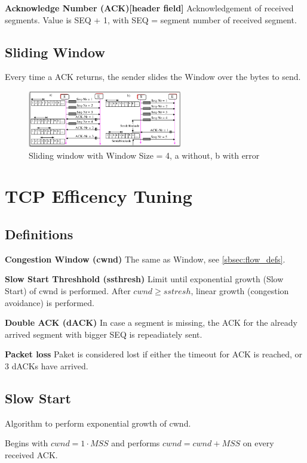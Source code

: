 \documentclass{article}
\begin{document}
\textbf{Acknowledge Number (ACK)[header field]}
Acknowledgement of received segments. Value is SEQ + 1, with SEQ = segment number of received segment.

\subsection{Sliding Window}
Every time a ACK returns, the sender slides the Window over the bytes to send.
\begin{figure}[h]
    \centering
    \includegraphics[width=0.6\textwidth]{media/sliding_window.png}
    \caption{Sliding window with Window Size = 4, a without, b with error}
    \label{fig:sliding}
\end{figure}


\section{TCP Efficency Tuning}
\subsection{Definitions}

\textbf{Congestion Window (cwnd)}
The same as Window, see \ref{sbsec:flow_defs}.

\textbf{Slow Start Threshhold (ssthresh)}
Limit until exponential growth (Slow Start) of cwnd is performed. After $cwnd \geq sstresh$, linear growth (congestion avoidance) is performed.

\textbf{Double ACK (dACK)}
In case a segment is missing, the ACK for the already arrived segment with bigger SEQ is repeadiately sent.

\textbf{Packet loss}
Paket is considered lost if either the timeout for ACK is reached, or 3 dACKs have arrived.

\subsection{Slow Start}
Algorithm to perform exponential growth of cwnd.

Begins with $cwnd = 1 \cdot MSS$ and performs $cwnd = cwnd + MSS$ on every received ACK.
\end{document}
